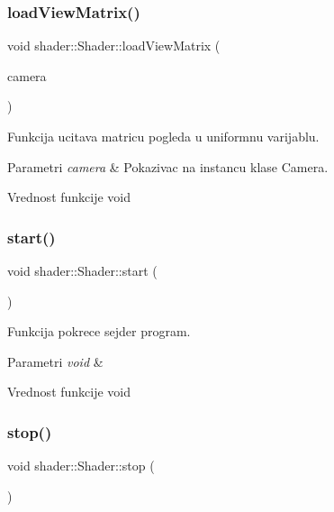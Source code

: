 \subsubsection{\texorpdfstring{load\+View\+Matrix()}{loadViewMatrix()}}
{\footnotesize\ttfamily void shader\+::\+Shader\+::load\+View\+Matrix (\begin{DoxyParamCaption}\item[{\hyperlink{classentity_1_1Camera}{Camera} $\ast$}]{camera }\end{DoxyParamCaption})}



Funkcija ucitava matricu pogleda u uniformnu varijablu. 


\begin{DoxyParams}{Parametri}
{\em camera} & Pokazivac na instancu klase Camera. \\
\hline
\end{DoxyParams}
\begin{DoxyReturn}{Vrednost funkcije}
void 
\end{DoxyReturn}
\mbox{\label{classshader_1_1Shader_adb075db73fc6fc5e6bf4d924bc11e6c6}} 
\subsubsection{\texorpdfstring{start()}{start()}}
{\footnotesize\ttfamily void shader\+::\+Shader\+::start (\begin{DoxyParamCaption}\item[{void}]{ }\end{DoxyParamCaption})}



Funkcija pokrece sejder program. 


\begin{DoxyParams}{Parametri}
{\em void} & \\
\hline
\end{DoxyParams}
\begin{DoxyReturn}{Vrednost funkcije}
void 
\end{DoxyReturn}
\mbox{\label{classshader_1_1Shader_a47fa58ad9ede974fe115c73c15c59691}} 
\subsubsection{\texorpdfstring{stop()}{stop()}}
{\footnotesize\ttfamily void shader\+::\+Shader\+::stop (\begin{DoxyParamCaption}\item[{void}]{ }\end{DoxyParamCaption})}



